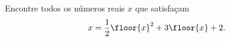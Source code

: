 Encontre todos os números reais $x$ que satisfaçam
$$x = \frac{1}{2} \floor{x}^2 + 3\floor{x} + 2.$$
